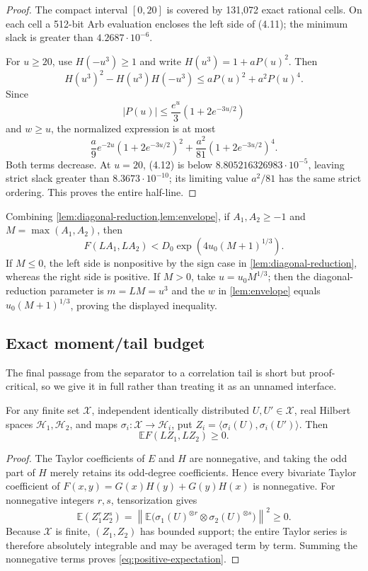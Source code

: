 \begin{proof}
The compact interval \([0,20]\) is covered by 131,072 exact rational cells.
On each cell a 512-bit Arb evaluation encloses the left side of (4.11); the
minimum slack is greater than \(4.2687\cdot10^{-6}\).

For \(u\ge20\), use \(H(-u^3)\ge1\) and write
\(H(u^3)=1+aP(u)^2\).  Then
\[
 H(u^3)^2-H(u^3)H(-u^3)
 \le aP(u)^2+a^2P(u)^4.
\]
Since
\[
 |P(u)|\le\frac{e^u}{3}(1+2e^{-3u/2})
\]
and \(w\ge u\), the normalized expression is at most
\[
 \frac a9e^{-2u}(1+2e^{-3u/2})^2
 +\frac{a^2}{81}(1+2e^{-3u/2})^4.
 \tag{4.12}
\]
Both terms decrease.  At \(u=20\), (4.12) is below
\(8.805216326983\cdot10^{-5}\), leaving strict slack greater than
\(8.3673\cdot10^{-10}\); its limiting value \(a^2/81\) has the same strict
ordering.  This proves the entire half-line.
\end{proof}

Combining \cref{lem:diagonal-reduction,lem:envelope}, if
\(A_1,A_2\ge-1\) and \(M=\max(A_1,A_2)\), then
\[
 F(LA_1,LA_2)<D_0\exp\!\left(4u_0(M+1)^{1/3}\right).
 \tag{4.13}
\]
If \(M\le0\), the left side is nonpositive by the sign case in
\cref{lem:diagonal-reduction}, whereas the right side is positive.  If
\(M>0\), take \(u=u_0M^{1/3}\); then the diagonal-reduction parameter is
\(m=LM=u^3\) and the \(w\) in \cref{lem:envelope} equals
\(u_0(M+1)^{1/3}\), proving the displayed inequality.

\subsection{Exact moment/tail budget}

The final passage from the separator to a correlation tail is short but
proof-critical, so we give it in full rather than treating it as an unnamed
interface.

\begin{lemma}\label{lem:positive-expectation}
For any finite set \(\mathcal X\), independent identically distributed
\(U,U'\in\mathcal X\), real Hilbert spaces \(\mathcal H_1,\mathcal H_2\),
and maps \(\sigma_i:\mathcal X\to\mathcal H_i\), put
\(Z_i=\langle\sigma_i(U),\sigma_i(U')\rangle\).  Then
\[
 \mathbb E F(LZ_1,LZ_2)\ge0.
 \tag{4.14}\label{eq:positive-expectation}
\]
\end{lemma}

\begin{proof}
The Taylor coefficients of \(E\) and \(H\) are nonnegative, and taking the
odd part of \(H\) merely retains its odd-degree coefficients.  Hence every
bivariate Taylor coefficient of
\(F(x,y)=G(x)H(y)+G(y)H(x)\) is nonnegative.  For nonnegative integers
\(r,s\), tensorization gives
\[
 \mathbb E(Z_1^rZ_2^s)
 =\left\|\mathbb E\bigl(
   \sigma_1(U)^{\otimes r}\otimes
   \sigma_2(U)^{\otimes s}\bigr)\right\|^2\ge0.
\]
Because \(\mathcal X\) is finite, \((Z_1,Z_2)\) has bounded support; the
entire Taylor series is therefore absolutely integrable and may be averaged
term by term.  Summing the nonnegative terms proves
\eqref{eq:positive-expectation}.
\end{proof}

